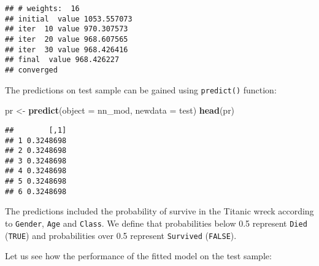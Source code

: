 \documentclass[]{book}
\newenvironment{Shaded}{\begin{snugshade}}{\end{snugshade}}
\newcommand{\KeywordTok}[1]{\textcolor[rgb]{0.13,0.29,0.53}{\textbf{{#1}}}}
\newcommand{\DataTypeTok}[1]{\textcolor[rgb]{0.13,0.29,0.53}{{#1}}}
\newcommand{\DecValTok}[1]{\textcolor[rgb]{0.00,0.00,0.81}{{#1}}}
\newcommand{\StringTok}[1]{\textcolor[rgb]{0.31,0.60,0.02}{{#1}}}
\newcommand{\NormalTok}[1]{{#1}}
\begin{document}
\begin{verbatim}
## # weights:  16
## initial  value 1053.557073 
## iter  10 value 970.307573
## iter  20 value 968.607565
## iter  30 value 968.426416
## final  value 968.426227 
## converged
\end{verbatim}

The predictions on test sample can be gained using \texttt{predict()}
function:

\begin{Shaded}
\begin{Highlighting}[]
\NormalTok{pr <-}\StringTok{ }\KeywordTok{predict}\NormalTok{(}\DataTypeTok{object =} \NormalTok{nn_mod, }\DataTypeTok{newdata =} \NormalTok{test)}
\KeywordTok{head}\NormalTok{(pr)}
\end{Highlighting}
\end{Shaded}

\begin{verbatim}
##        [,1]
## 1 0.3248698
## 2 0.3248698
## 3 0.3248698
## 4 0.3248698
## 5 0.3248698
## 6 0.3248698
\end{verbatim}

The predictions included the probability of survive in the Titanic wreck
according to \texttt{Gender}, \texttt{Age} and \texttt{Class}. We define
that probabilities below 0.5 represent \texttt{Died} (\texttt{TRUE}) and
probabilities over 0.5 represent \texttt{Survived} (\texttt{FALSE}).

\begin{Shaded}
\end{Shaded}

Let us see how the performance of the fitted model on the test sample:

\begin{Shaded}
\end{Shaded}
\end{document}
